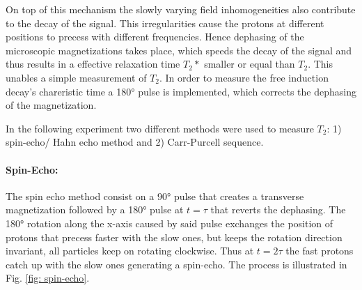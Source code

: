 On top of this mechanism the slowly varying field inhomogeneities also contribute to the decay of the signal. This irregularities cause
the protons at different positions to precess with different frequencies. Hence dephasing of the microscopic magnetizations takes place, which speeds the decay of the signal and thus results in a effective relaxation time $T_2*$ smaller or equal than $T_2$. This unables a simple measurement of $T_2$. In order to measure the free induction decay's chareristic time a 180° pulse is implemented, which corrects the dephasing of the magnetization. 

In the following experiment two different methods were used to measure $T_2$: 1) spin-echo/ Hahn echo method and 2) Carr-Purcell sequence.
\paragraph{Spin-Echo:}
The spin echo method consist on a 90° pulse that creates a transverse magnetization followed by a 180° pulse at $t = \tau$ that reverts the dephasing. The 180° rotation along the x-axis caused by said pulse exchanges the position of protons that precess faster with the
 slow ones, but keeps the rotation direction invariant, all particles keep on rotating clockwise. Thus at $t = 2\tau$ the fast protons catch up with the slow ones generating a spin-echo. The process is illustrated in Fig. \ref{fig: spin-echo}. 
 
